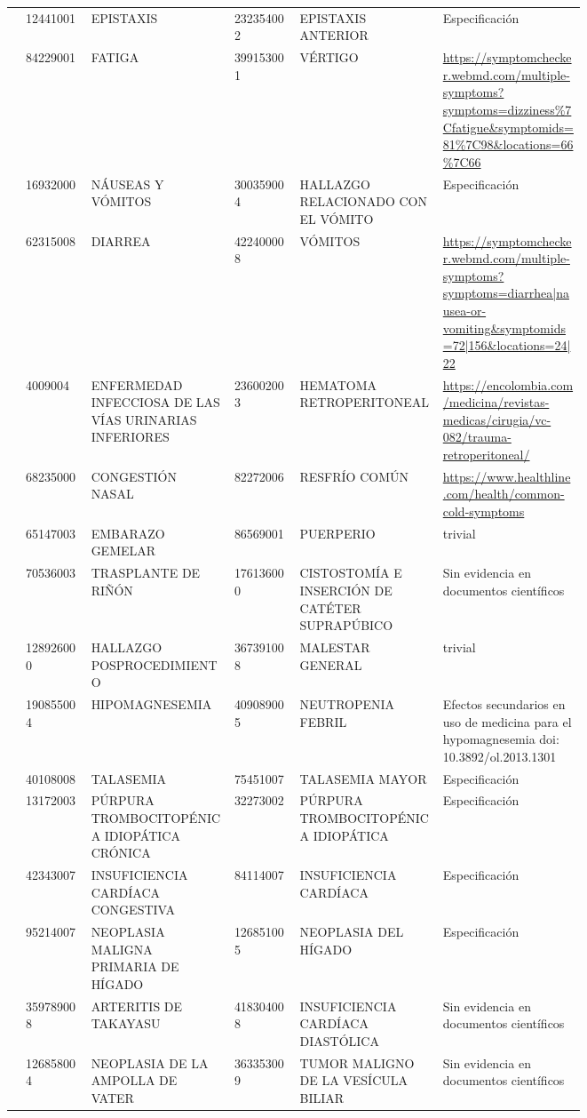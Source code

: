 \begin{landscape}
\begin{longtable}[c]{@{}llp{0.25\linewidth}lp{0.25\linewidth}p{0.25\linewidth}@{}}
 & 12441001 & EPISTAXIS & 232354002 & EPISTAXIS ANTERIOR & Especificación \\
 & 84229001 & FATIGA & 399153001 & VÉRTIGO & \url{https://symptomchecker.webmd.com/multiple-symptoms?symptoms=dizziness\%7Cfatigue\&symptomids=81\%7C98\&locations=66\%7C66} \\
 & 16932000 & NÁUSEAS Y VÓMITOS & 300359004 & HALLAZGO RELACIONADO CON EL VÓMITO & Especificación \\
 & 62315008 & DIARREA & 422400008 & VÓMITOS & \url{https://symptomchecker.webmd.com/multiple-symptoms?symptoms=diarrhea|nausea-or-vomiting\&symptomids=72|156\&locations=24|22} \\
 & 4009004 & ENFERMEDAD INFECCIOSA DE LAS VÍAS URINARIAS INFERIORES & 236002003 & HEMATOMA RETROPERITONEAL & \url{https://encolombia.com/medicina/revistas-medicas/cirugia/vc-082/trauma-retroperitoneal/} \\
 & 68235000 & CONGESTIÓN NASAL & 82272006 & RESFRÍO COMÚN & \url{https://www.healthline.com/health/common-cold-symptoms} \\
 & 65147003 & EMBARAZO GEMELAR & 86569001 & PUERPERIO & trivial \\
 & 70536003 & TRASPLANTE DE RIÑÓN & 176136000 & CISTOSTOMÍA E INSERCIÓN DE CATÉTER SUPRAPÚBICO & Sin evidencia en documentos científicos \\
 & 128926000 & HALLAZGO POSPROCEDIMIENTO & 367391008 & MALESTAR GENERAL & trivial \\
 & 190855004 & HIPOMAGNESEMIA & 409089005 & NEUTROPENIA FEBRIL & Efectos secundarios en uso de medicina para el hypomagnesemia  doi:  10.3892/ol.2013.1301 \\
 & 40108008 & TALASEMIA & 75451007 & TALASEMIA MAYOR & Especificación \\
 & 13172003 & PÚRPURA TROMBOCITOPÉNICA IDIOPÁTICA CRÓNICA & 32273002 & PÚRPURA TROMBOCITOPÉNICA IDIOPÁTICA & Especificación \\
 & 42343007 & INSUFICIENCIA CARDÍACA CONGESTIVA & 84114007 & INSUFICIENCIA CARDÍACA & Especificación \\
 & 95214007 & NEOPLASIA MALIGNA PRIMARIA DE HÍGADO & 126851005 & NEOPLASIA DEL HÍGADO & Especificación \\
 & 359789008 & ARTERITIS DE TAKAYASU & 418304008 & INSUFICIENCIA CARDÍACA DIASTÓLICA & Sin evidencia en documentos científicos \\
 & 126858004 & NEOPLASIA DE LA AMPOLLA DE VATER & 363353009 & TUMOR MALIGNO DE LA VESÍCULA BILIAR & Sin evidencia en documentos científicos \\

\end{longtable}
\end{landscape}
